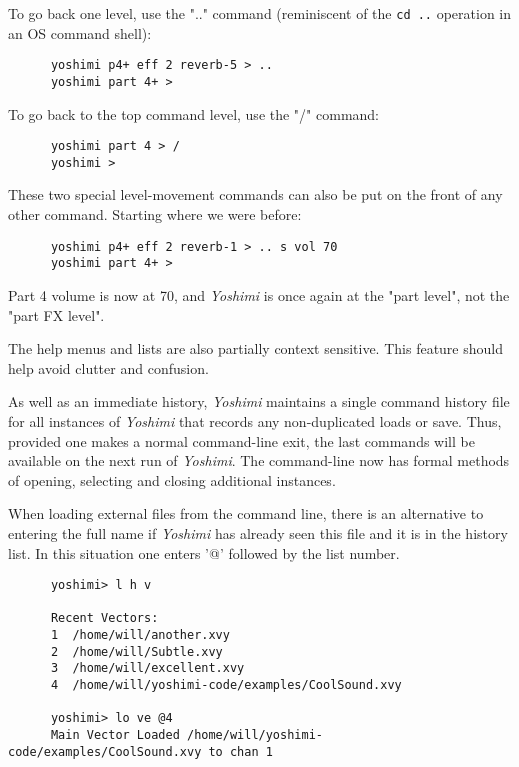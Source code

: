    To go back one level, use the ".." command (reminiscent of the \texttt{cd ..} operation in an OS command shell):

   \begin{verbatim}
      yoshimi p4+ eff 2 reverb-5 > ..
      yoshimi part 4+ >
   \end{verbatim}

   To go back to the top command level, use the "/" command:

   \begin{verbatim}
      yoshimi part 4 > /
      yoshimi >
   \end{verbatim}

   These two special level-movement commands can also be put on the front of
   any other command.  Starting where we were before:

   \begin{verbatim}
      yoshimi p4+ eff 2 reverb-1 > .. s vol 70
      yoshimi part 4+ >
   \end{verbatim}

   Part 4 volume is now at 70, and \textsl{Yoshimi} is once again at the
   "part level", not the "part FX level".

   The help menus and lists are also partially context sensitive. This
   feature should help avoid clutter and confusion.

   As well as an immediate history, \textsl{Yoshimi} maintains a single command
   history file for all instances of \textsl{Yoshimi} that records any
   non-duplicated loads or save.  Thus, provided one makes a normal
   command-line exit, the last commands will be available on the next run of
   \textsl{Yoshimi}.
   The command-line now has formal methods of opening, selecting and closing
   additional instances.

   When loading external files from the command line, there is an alternative
   to entering the full name if \textsl{Yoshimi} has already seen this file and
   it is in the history list. In this situation one enters '@' followed by the
   list number.

   \begin{verbatim}
      yoshimi> l h v

      Recent Vectors:
      1  /home/will/another.xvy
      2  /home/will/Subtle.xvy
      3  /home/will/excellent.xvy
      4  /home/will/yoshimi-code/examples/CoolSound.xvy

      yoshimi> lo ve @4
      Main Vector Loaded /home/will/yoshimi-code/examples/CoolSound.xvy to chan 1
   \end{verbatim}


